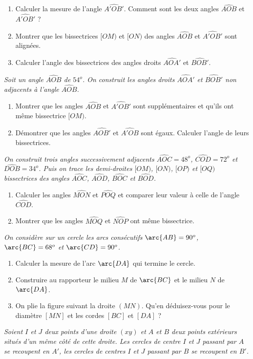 \begin{itemize}
\begin{enumerate}
\item Calculer la mesure de l'angle $\widehat{A'OB'}$. Comment sont les deux angles $\widehat{AOB}$ et $\widehat{A'OB'}$ ? 
\item Montrer que les bissectrices $[OM)$ et $[ON)$ des angles $\widehat{AOB}$ et $\widehat{A'OB'}$ sont alignées.
\item Calculer l'angle des bissectrices des angles droits $\widehat{AOA'}$ et $\widehat{BOB'}$.
\end{enumerate}
\it Soit un angle $\widehat{AOB}$ de $54^o$. On construit les angles droits $\widehat{AOA'}$ et $\widehat{BOB'}$ non adjacents à l'angle $\widehat{AOB}$.\begin{enumerate}
\item Montrer que les angles $\widehat{AOB}$ et $\widehat{A'OB'}$ sont supplémentaires et qu'ils ont même bissectrice $[OM)$.
\item Démontrer que les angles $\widehat{AOB'}$ et $\widehat{A'OB}$ sont égaux. Calculer l'angle de leurs bissectrices.
\end{enumerate}
\it On construit trois angles successivement adjacents 
$\widehat{AOC} = 48^o$, $\widehat{COD}= 72^o$ et $\widehat{DOB}= 34^o$. Puis on trace les demi-droites $[OM)$, $[ON)$, $[OP)$ et $[OQ)$ bissectrices des angles $\widehat{AOC}$, $\widehat{AOD}$, $\widehat{BOC}$ et $\widehat{BOD}$. \begin{enumerate}
\item Calculer les angles $\widehat{MON}$ et $\widehat{POQ}$ et comparer leur valeur à celle de l'angle $\widehat{COD}$.
\item Montrer que les angles $\widehat{MOQ}$ et $\widehat{NOP}$ ont même bissectrice. 
\end{enumerate}
\it On considère sur un cercle les arcs consécutifs $\arc{AB} = 90^o$, $\arc{BC} = 68^o$ et $\arc{CD} = 90^o$. \begin{enumerate}
\item Calculer la mesure de l'arc $\arc{DA}$ qui termine le cercle. 
\item Construire au rapporteur le milieu $M$ de $\arc{BC}$ et le milieu $N$ de $\arc{DA}$. 
\item On plie la figure suivant la droite $(MN)$. Qu'en déduisez-vous pour le diamètre $[MN]$ et les cordes $[BC]$ et $[DA]$ ? 
\end{enumerate}
\it Soient $I$ et $J$ deux points d'une droite $(xy)$ et $A$ et $B$ deux points extérieurs situés d'un même côté de cette droite. Les cercles de centre $I$ et $J$ passant par $A$ se recoupent en $A'$, les cercles de centres $I$ et $J$ passant par $B$ se recoupent en $B'$. 

\end{itemize}
